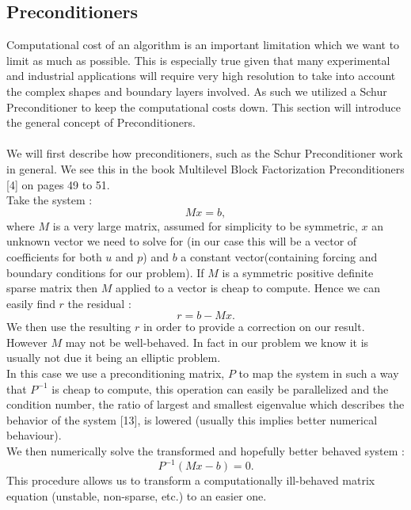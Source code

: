 \documentclass[11pt,twoside,a4paper]{article}
\begin{document}
\subsection{Preconditioners}
Computational cost of an algorithm is an important limitation which we want to limit as much as possible. This is especially true given that many experimental and industrial applications will require very high resolution to take into account the complex shapes and boundary layers involved. As such we utilized a Schur Preconditioner to keep the computational costs down. This section will introduce the general concept of Preconditioners.\\
\\
We will first describe how preconditioners, such as the Schur Preconditioner work in general. We see this in the book Multilevel Block Factorization Preconditioners [4] on pages 49 to 51.\\
Take the system :\\
$$
Mx = b ,
$$
where $M$ is a very large matrix, assumed for simplicity to be symmetric, $x$ an unknown vector we need to solve for (in our case this will be a vector of coefficients for both $u$ and $p$) and $b$ a constant vector(containing forcing and boundary conditions for our problem). If $M$ is a symmetric positive definite sparse matrix then $M$ applied to a vector is cheap to compute. Hence we can easily find $r$ the residual :\\
$$
r = b - Mx .
$$
We then use the resulting $r$ in order to provide a correction on our result.\\
However $M$ may not be well-behaved. In fact in our problem we know it is usually not due it being an elliptic problem.\\
In this case we use a preconditioning matrix, $P$ to map the system in such a way that $P^{-1}$ is cheap to compute, this operation can easily be parallelized and the condition number, the ratio of largest and smallest eigenvalue which describes the behavior of the system [13], is lowered (usually this implies better numerical behaviour).\\
We then numerically solve the transformed and hopefully better behaved system :
$$
P^{-1}(Mx-b) = 0 .
$$
This procedure allows us to transform a computationally ill-behaved matrix equation (unstable, non-sparse, etc.) to an easier one.
\end{document}
